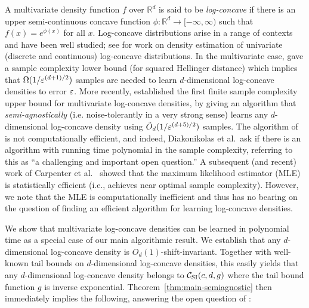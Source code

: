 \medskip
{} A multivariate density function $f$ over $\mathbb{R}^d$ is said to be \emph{log-concave} if there is an upper semi-continuous concave function $\phi: \mathbb{R}^d \to [-\infty,\infty)$ such that $f(x) = e^{\phi(x)}$ for all $x$.  Log-concave distributions arise in a range of contexts and have been well studied; see \citep{CDSS13,CDSS14,acharya2017sample,AcharyaDK15,CanonneDGR16,DKS16a} for work on density estimation of univariate (discrete and continuous) log-concave distributions.  In the multivariate case, 
\citep{KimSamworth14} 
gave a sample complexity lower bound (for squared Hellinger distance) which implies that $\Omega(1/\varepsilon^{(d+1)/2})$ samples are needed to learn $d$-dimensional log-concave densities to error $\varepsilon$.  More recently, \citep{diakonikolas2016learning} established the first finite sample complexity upper bound for multivariate log-concave densities, by giving an algorithm that \emph{semi-agnostically} (i.e. noise-tolerantly in a very strong sense) learns any $d$-dimensional log-concave density using $\tilde{O}_d(1/\varepsilon^{(d+5)/2})$ samples.  The 
algorithm of \citep{diakonikolas2016learning} 
is not computationally efficient, and indeed, Diakonikolas et al.\ ask if there is an algorithm with running time polynomial in the sample complexity, referring to this as ``a challenging and important open question.'' A subsequent (and recent) work of 
Carpenter et al.~\citep{carpenter2018} showed that the maximum likelihood estimator (MLE) is statistically efficient (i.e., achieves near optimal sample complexity). However, we note that the MLE is computationally inefficient and thus has no bearing on the question of finding an efficient algorithm for learning log-concave densities.



We show that multivariate log-concave densities can be learned in
polynomial time as a special case of our main algorithmic result.  We
establish that any $d$-dimensional log-concave density is
$O_d(1)$-shift-invariant.  Together with well-known tail bounds on
$d$-dimensional log-concave densities, this easily yields that any
$d$-dimensional log-concave density belongs to ${\mathcal C}_{\mathrm{SI}}(c,d,g)$ where the
tail bound function $g$ is inverse exponential.
Theorem~\ref{thm:main-semiagnostic} then immediately implies the
following, answering the open question of
\citep{diakonikolas2016learning}:

